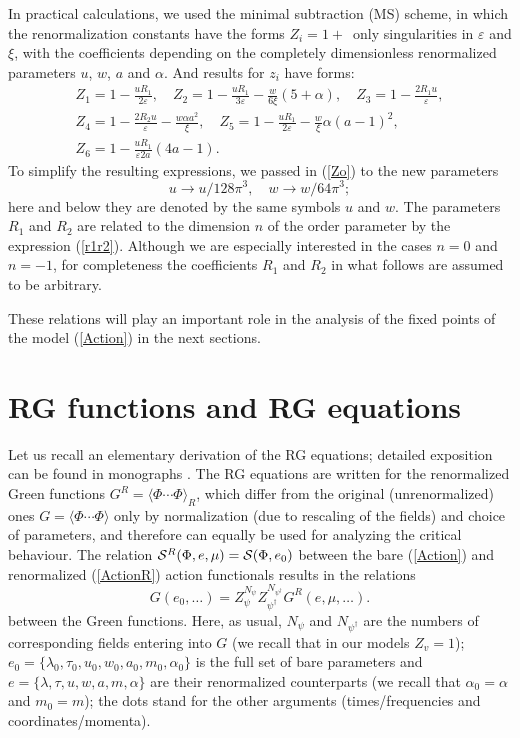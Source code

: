\documentclass[12pt]{article}
\def\S{{\cal S}}
\begin{document}
In practical calculations, we used the minimal subtraction (MS) scheme,
in which the renormalization constants have the forms $Z_{i}=1+\,$ only
singularities in $\varepsilon$ and $\xi$, with the coefficients depending
on the completely dimensionless renormalized parameters $u$, $w$, $a$ and
$\alpha$. And results for $z_{i}$ have forms:
\begin{eqnarray}
Z_{1} = 1 - \frac{uR_{1}}{2\varepsilon}, \quad
Z_{2} = 1 - \frac{uR_{1}}{3\varepsilon} - \frac{w}{6\xi}(5+\alpha), \quad
Z_{3} = 1 - \frac{2R_{1}u}{\varepsilon}, \nonumber \\
Z_{4} = 1 - \frac{2R_{2}u}{\varepsilon} - \frac{w \alpha a^2}{\xi}, \quad
Z_{5} = 1 - \frac{uR_{1}}{2\varepsilon} - \frac{w}{\xi} \alpha (a-1)^{2}, \nonumber \\
Z_{6} = 1 - \frac{uR_{1}}{\varepsilon 2a}(4a-1). 
\label{Zo}
\end{eqnarray}
To simplify the resulting expressions, we passed in (\ref{Zo})
 to the new parameters
\[ u \to u/128\pi^3, \quad w \to w/64\pi^3; \]
here and below they are denoted by the same symbols $u$ and $w$.
The parameters $R_{1}$ and $R_{2}$ are related to the dimension $n$ of the order parameter by the 
expression (\ref{r1r2}). Although we are especially interested in the cases $n=0$ and $n=-1$,
for completeness the coefficients $R_{1}$ and $R_{2}$ in  what follows are assumed to be arbitrary.

These relations will play an important role in the analysis of the
fixed points of the model (\ref{Action}) in the next sections.


\section{RG functions and RG equations} \label{sec:RGE}

Let us recall an elementary derivation of the RG equations; detailed
exposition can be found in monographs \cite{Zinn,Book3}.
The RG equations are written for the renormalized Green functions
$G^{R} =\langle \Phi\cdots\Phi\rangle_{R}$, which differ from the original
(unrenormalized) ones $G =\langle \Phi\cdots\Phi\rangle$ only by
normalization (due to rescaling of the fields) and choice of parameters,
and therefore can equally be used for analyzing the critical behaviour.
The relation $\S^{R} (\Phi,e,\mu) = \S(\Phi,e_{0})$ between the bare
(\ref{Action}) and renormalized
(\ref{ActionR}) action functionals results
in the relations
\begin{equation}
G(e_{0},\dots) = Z_{\psi}^{N_{\psi}} Z_{\psi^{\dagger}}^{N_{\psi^{\dagger}}}
G^{R}(e,\mu,\dots).
\label{multi}
\end{equation}
between the Green functions. Here, as usual, $N_{\psi}$ and
$N_{\psi^{\dagger}}$ are the numbers of corresponding fields
entering into $G$ (we recall that in our models $Z_{v}=1$);
$e_{0}=\{\lambda_{0}, \tau_{0}, u_{0}, w_{0}, a_{0}, m_{0}, \alpha_{0} \}$
is the full set of bare parameters and
$e=\{ \lambda, \tau, u, w, a, m, \alpha  \}$ are their renormalized
counterparts (we recall that $\alpha_{0}=\alpha$ and $m_{0}=m$);
the dots stand for the other arguments
(times/frequencies and coordinates/momenta).
\end{document}
